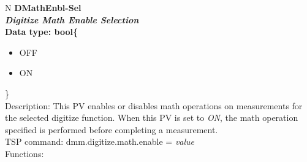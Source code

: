 \documentclass[openany]{article}
\begin{document}
		\begin{tabular}{N}
			\hline
			\bfseries DMathEnbl-Sel\label{pv:dmathenbl-sel} \\ \hline
			\emph{Digitize Math Enable Selection} \\
			Data type: bool\{\begin{itemize}[noitemsep]
				\small
				\item[] OFF
				\item[] ON
			\end{itemize}\} \\
			Description: This PV enables or disables math operations on measurements for the selected digitize function. When this PV is set to \emph{ON}, the math operation specified is performed before completing a measurement. \\
			TSP command: dmm.digitize.math.enable = \emph{value} \\
			Functions: \\
			\arrayrulecolor{\FuncTableBorderColor}

		\end{tabular}
\end{document}
